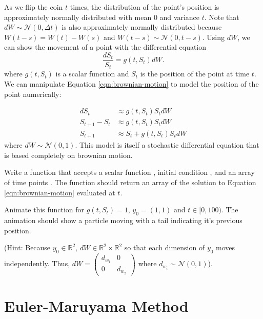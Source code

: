 As we flip the coin $t$ times, the distribution of the point's position is approximately normally distributed with mean 0 and variance $t$.
Note that $dW\sim\mathscr{N}(0,\Delta t)$ is also approximately normally distributed because $W(t-s)=W(t)-W(s)$ and $W(t-s)\sim\mathscr{N}(0,t-s)$.
Using $dW$, we can show the movement of a point with the differential equation
\begin{equation}
\frac{dS_t}{S_t}=g(t,S_t)dW.
\label{eqn:brownian-motion}
\end{equation}
where $g(t,S_t)$ is a scalar function and $S_t$ is the position of the point at time $t$.
We can manipulate Equation \ref{eqn:brownian-motion} to model the position of the point numerically:


\begin{align*}
dS_t&\approx g(t,S_t)S_tdW\\
S_{t+1}-S_t&\approx g(t,S_t)S_tdW\\
S_{t+1}&\approx S_t+g(t,S_t)S_tdW
\end{align*}
where $dW\sim\mathscr{N}(0,1)$.
This model is itself a stochastic differential equation that is based completely on brownian motion.

\begin{problem}
Write a function  that accepts a scalar function , initial condition , and an array of time points .
The function should return an array of the solution to Equation \ref{eqn:brownian-motion} evaluated at $t$.

Animate this function for $g(t,S_t)=1$, $y_0=(1,1)$ and $t\in[0,100)$.
The animation should show a particle moving with a tail indicating it's previous position.

(Hint: Because $y_0\in\mathbb{R}^2$, $dW\in\mathbb{R}^2\times\mathbb{R}^2$ so that each dimension of $y_0$ moves independently. Thus, $dW=\begin{pmatrix}d_{w_1}&0\\0&d_{w_2}\end{pmatrix}$ where $d_{w_i}\sim\mathscr{N}(0,1)$).
\label{prob:brownian-motion}
\end{problem}

\section*{Euler-Maruyama Method}

